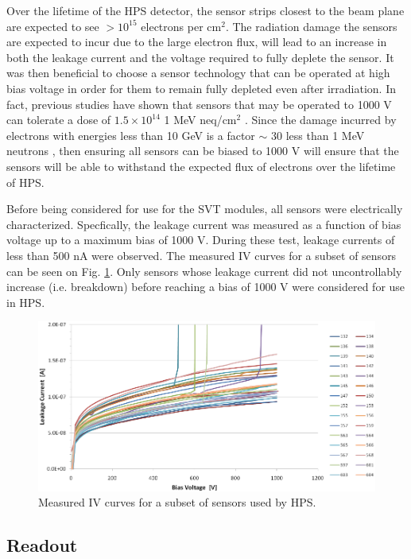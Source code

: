 Over the lifetime of the HPS detector, the sensor strips closest to the beam 
plane are expected to see $>10^{15}$ electrons per cm$^2$.  The radiation
damage the sensors are expected to incur due to the large electron flux,
will lead to an increase in both the leakage current and the voltage required to 
fully deplete the sensor.  It was then beneficial to choose a sensor technology
that can be operated at high bias voltage in order for them to remain fully
depleted even after irradiation. In fact, previous studies have shown that 
sensors that may be operated to 1000 V can tolerate a dose of 
$1.5 \times 10^{14}$ 1 MeV neq/cm$^2$ \cite{Fretwurst:2002vb}.  Since the damage
incurred by electrons with energies less than 10 GeV is a factor $\sim$ 30 less
than 1 MeV neutrons \cite{Rashevskaya:2002nd},
then ensuring all sensors can be biased to 1000 V will ensure that the sensors
will be able to withstand the expected flux of electrons over the lifetime of
HPS. 


Before being considered for use for the SVT modules, all sensors were electrically 
characterized.  Specfically, the leakage current was measured as a function
of bias voltage up to a maximum bias of 1000 V.  During these test, leakage 
currents of less than 500 nA were observed.  The measured IV curves for a subset
of sensors can be seen on Fig. \ref{fig:sensor_iv_curves}.  Only sensors whose
leakage current did not uncontrollably increase (i.e. breakdown) before reaching
a bias of 1000 V  were considered for use in HPS.
\begin{figure}[h!t]
    \centering
    \includegraphics[width=\textwidth]{images/sensor_iv_curves.png}
    \caption{Measured IV curves for a subset of sensors used by HPS.}
    \label{fig:sensor_iv_curves}
\end{figure}

\subsection{Readout} \label{subsec:readout}

